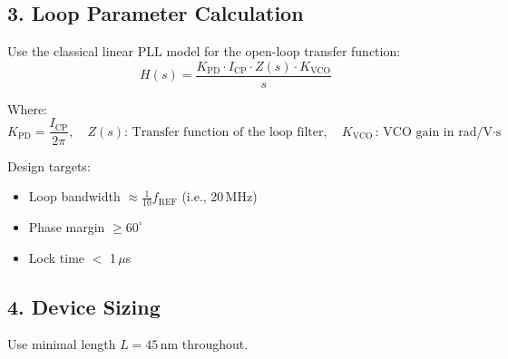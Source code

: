 \subsection*{3. Loop Parameter Calculation}
Use the classical linear PLL model for the open-loop transfer function:
\[
H(s) = \frac{K_{\text{PD}} \cdot I_{\text{CP}} \cdot Z(s) \cdot K_{\text{VCO}}}{s}
\]

Where:
\[
K_{\text{PD}} = \frac{I_{\text{CP}}}{2\pi}, \quad Z(s) \text{: Transfer function of the loop filter}, \quad K_{\text{VCO}} \text{: VCO gain in rad/V$\cdot$s}
\]

Design targets:
\begin{itemize}
    \item Loop bandwidth $\approx \frac{1}{10} f_{\text{REF}}$ (i.e., 20\,MHz)
    \item Phase margin $\geq 60^\circ$
    \item Lock time $<$ 1\,$\mu$s
\end{itemize}

\subsection*{4. Device Sizing}
Use minimal length $L = 45$\,nm throughout.

